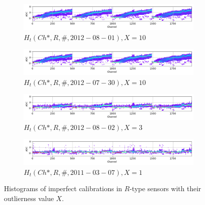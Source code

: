 \begin{figure}
    \begin{subfigure}[b]{\textwidth}
    \centering
    \includegraphics[width=0.9\linewidth]{figures/chapter4/calib_analysis/P2-all-bad-cals-R-0.png}
    \caption{$H_t(Ch*, R, \#, 2012-08-01), X=10$}
    \label{plot:all-bad-r-0}
  \end{subfigure}


    \begin{subfigure}[b]{\textwidth}
    \centering
    \includegraphics[width=0.9\linewidth]{figures/chapter4/calib_analysis/P2-all-bad-cals-R-1.png}
    \caption{$H_t(Ch*, R, \#, 2012-07-30), X=10$}
    \label{plot:all-bad-r-1}
  \end{subfigure}


    \begin{subfigure}[b]{\textwidth}
    \centering
    \includegraphics[width=0.9\linewidth]{figures/chapter4/calib_analysis/P2-all-bad-cals-R-2.png}
    \caption{$H_t(Ch*, R, \#, 2012-08-02), X=3$}
    \label{plot:all-bad-r-2}
  \end{subfigure}


    \begin{subfigure}[b]{\textwidth}
    \centering
    \includegraphics[width=0.9\linewidth]{figures/chapter4/calib_analysis/P2-all-bad-cals-R-3.png}
    \caption{$H_t(Ch*, R, \#, 2011-03-07), X=1$}
    \label{plot:all-bad-r-3}
  \end{subfigure}
    \caption{Histograms of imperfect calibrations in $R$-type sensors with their outlierness value $X$.}
\end{figure}

